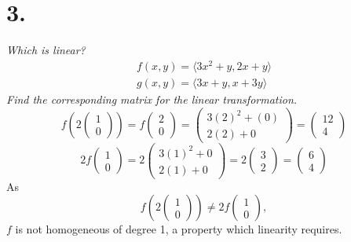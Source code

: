 \documentclass[12pt]{article}
\begin{document}
\section*{3.}
\textit{Which is linear?}
\begin{gather*}
	f(x,y) = \langle 3x^2 + y, 2x + y \rangle \\
	g(x,y) = \langle 3x + y, x + 3y \rangle
\end{gather*}
\textit{Find the corresponding matrix for the linear transformation.}
\bigskip
\begin{equation*}
	f(2
	\begin{pmatrix}
		1 \\
		0
	\end{pmatrix}
	)
	=
	f
	\begin{pmatrix}
		2 \\
		0
	\end{pmatrix}
	=
	\begin{pmatrix}
		3(2)^2 + (0) \\
		2(2) + 0
	\end{pmatrix}
	=
	\begin{pmatrix}
		12 \\
		4
	\end{pmatrix}
\end{equation*}
\begin{equation*}
	2f
	\begin{pmatrix}
		1 \\
		0
	\end{pmatrix}
	=
	2
	\begin{pmatrix}
		3(1)^2 + 0 \\
		2(1) + 0
	\end{pmatrix}
	=
	2
	\begin{pmatrix}
		3 \\
		2
	\end{pmatrix}
	=
	\begin{pmatrix}
		6 \\
		4
	\end{pmatrix}
\end{equation*}
As
\begin{equation*}
	f(2
	\begin{pmatrix}
		1 \\
		0
	\end{pmatrix}
	)
	\neq
	2f
	\begin{pmatrix}
		1 \\
		0
	\end{pmatrix},
\end{equation*}
$f$ is not homogeneous of degree 1, a property which linearity requires. \\
\end{document}
